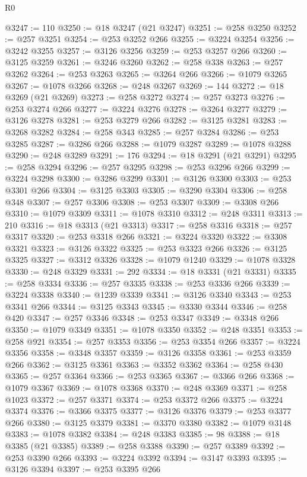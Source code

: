 \begin{lexlean}{R0}
\begin{coremodule}
@3247 := 110
@3250 := @18 @3247 (@21 @3247)
@3251 := @258 @3250
@3252 := @257 @3251
@3254 := @253 @3252 @266
@3255 := @3224 @3254
@3256 := @3242 @3255
@3257 := @3126 @3256
@3259 := @253 @3257 @266
@3260 := @3125 @3259
@3261 := @3246 @3260
@3262 := @258 @338
@3263 := @257 @3262
@3264 := @253 @3263
@3265 := @3264 @266
@3266 := @1079 @3265
@3267 := @1078 @3266
@3268 := @248 @3267
@3269 := 144
@3272 := @18 @3269 (@21 @3269)
@3273 := @258 @3272
@3274 := @257 @3273
@3276 := @253 @3274 @266
@3277 := @3224 @3276
@3278 := @3264 @3277
@3279 := @3126 @3278
@3281 := @253 @3279 @266
@3282 := @3125 @3281
@3283 := @3268 @3282
@3284 := @258 @343
@3285 := @257 @3284
@3286 := @253 @3285
@3287 := @3286 @266
@3288 := @1079 @3287
@3289 := @1078 @3288
@3290 := @248 @3289
@3291 := 176
@3294 := @18 @3291 (@21 @3291)
@3295 := @258 @3294
@3296 := @257 @3295
@3298 := @253 @3296 @266
@3299 := @3224 @3298
@3300 := @3286 @3299
@3301 := @3126 @3300
@3303 := @253 @3301 @266
@3304 := @3125 @3303
@3305 := @3290 @3304
@3306 := @258 @348
@3307 := @257 @3306
@3308 := @253 @3307
@3309 := @3308 @266
@3310 := @1079 @3309
@3311 := @1078 @3310
@3312 := @248 @3311
@3313 := 210
@3316 := @18 @3313 (@21 @3313)
@3317 := @258 @3316
@3318 := @257 @3317
@3320 := @253 @3318 @266
@3321 := @3224 @3320
@3322 := @3308 @3321
@3323 := @3126 @3322
@3325 := @253 @3323 @266
@3326 := @3125 @3325
@3327 := @3312 @3326
@3328 := @1079 @1240
@3329 := @1078 @3328
@3330 := @248 @3329
@3331 := 292
@3334 := @18 @3331 (@21 @3331)
@3335 := @258 @3334
@3336 := @257 @3335
@3338 := @253 @3336 @266
@3339 := @3224 @3338
@3340 := @1239 @3339
@3341 := @3126 @3340
@3343 := @253 @3341 @266
@3344 := @3125 @3343
@3345 := @3330 @3344
@3346 := @258 @420
@3347 := @257 @3346
@3348 := @253 @3347
@3349 := @3348 @266
@3350 := @1079 @3349
@3351 := @1078 @3350
@3352 := @248 @3351
@3353 := @258 @921
@3354 := @257 @3353
@3356 := @253 @3354 @266
@3357 := @3224 @3356
@3358 := @3348 @3357
@3359 := @3126 @3358
@3361 := @253 @3359 @266
@3362 := @3125 @3361
@3363 := @3352 @3362
@3364 := @258 @430
@3365 := @257 @3364
@3366 := @253 @3365
@3367 := @3366 @266
@3368 := @1079 @3367
@3369 := @1078 @3368
@3370 := @248 @3369
@3371 := @258 @1023
@3372 := @257 @3371
@3374 := @253 @3372 @266
@3375 := @3224 @3374
@3376 := @3366 @3375
@3377 := @3126 @3376
@3379 := @253 @3377 @266
@3380 := @3125 @3379
@3381 := @3370 @3380
@3382 := @1079 @3148
@3383 := @1078 @3382
@3384 := @248 @3383
@3385 := 98
@3388 := @18 @3385 (@21 @3385)
@3389 := @258 @3388
@3390 := @257 @3389
@3392 := @253 @3390 @266
@3393 := @3224 @3392
@3394 := @3147 @3393
@3395 := @3126 @3394
@3397 := @253 @3395 @266

\end{coremodule}
\end{lexlean}
